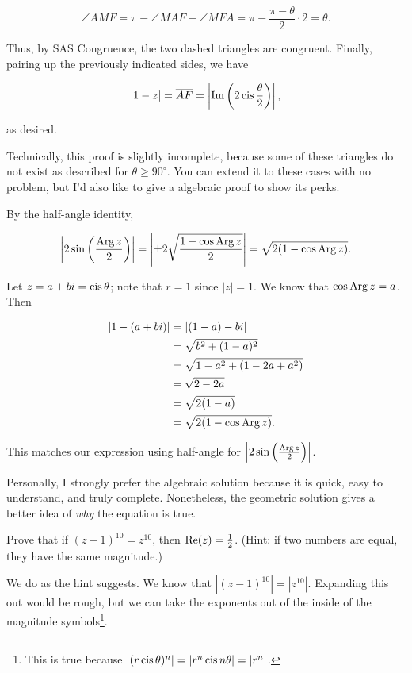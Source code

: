 \documentclass[../key.tex]{subfiles}
\begin{document}
$$\angle AMF = \pi - \angle MAF - \angle MFA = \pi - \frac{\pi - \theta}{2} \cdot 2 = \theta.$$

Thus, by SAS Congruence, the two dashed triangles are congruent. Finally, pairing up the previously indicated sides, we have

$$|1-z|=\overline{AF}=\left|\operatorname{Im}\left(2\operatorname{cis}\frac{\theta}{2}\right)\right|,$$

as desired.

Technically, this proof is slightly incomplete, because some of these triangles do not exist as described for $\theta \geq 90^\circ$. You can extend it to these cases with no problem, but I'd also like to give a algebraic proof to show its perks.

By the half-angle identity,

$$\left|2 \sin\left(\frac{\operatorname{Arg} z}{2}\right)\right| = \left|\pm 2\sqrt{\frac{1 - \cos\operatorname{Arg} z}{2}}\right| = \sqrt{2(1-\cos\operatorname{Arg} z)}.$$

Let $z=a+bi=\operatorname{cis} \theta$; note that $r=1$ since $|z|=1$. We know that $\cos\operatorname{Arg} z = a$. Then

\begin{align*}
|1-(a+bi)| &= |(1-a) - bi| \\
&= \sqrt{b^2 + (1-a)^2} \\
&= \sqrt{1 - a^2 + (1 - 2a + a^2)} \\
&= \sqrt{2 - 2a} \\
&= \sqrt{2(1-a)} \\
&= \sqrt{2(1-\cos\operatorname{Arg} z)}.
\end{align*}

This matches our expression using half-angle for $\left|2\sin\left(\frac{\operatorname{Arg} z}{2}\right)\right|$.

Personally, I strongly prefer the algebraic solution because it is quick, easy to understand, and truly complete. Nonetheless, the geometric solution gives a better idea of \textit{why} the equation is true.

\begin{outer_problem}
\item
\end{outer_problem}

\begin{inner_problem}[start=1]
\item Prove that if $(z-1)^{10}=z^{10}$, then $\operatorname{Re} (z) = \frac{1}{2}$. (Hint: if two numbers are equal, they have the same magnitude.)
\end{inner_problem}

We do as the hint suggests. We know that $|(z-1)^{10}|=|z^{10}|$. Expanding this out would be rough, but we can take the exponents out of the inside of the magnitude symbols\footnote{This is true because $|(r\operatorname{cis} \theta)^n|=|r^n\operatorname{cis} n\theta| = |r^n|$.}.
\end{document}
